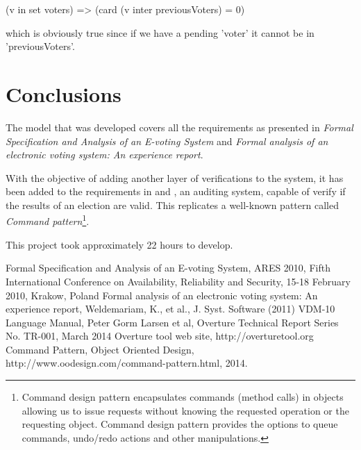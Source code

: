 \documentclass{article}
\begin{document}
\begin{vdmpp}
(v in set voters) => (card ({v} inter previousVoters) = 0) 
\end{vdmpp}

which is obviously true since if we have a pending 'voter' it cannot be in 'previousVoters'.

\section{Conclusions}
The model that was developed covers all the requirements as presented in \textit{Formal Specification and Analysis of an E-voting System}\cite{intro} and \textit{Formal analysis of an electronic voting system: An experience report}\cite{intro2}.

With the objective of adding another layer of verifications to the system, it has been added to the requirements in \cite{intro} and \cite{intro2}, an auditing system, capable of verify if the results of an election are valid. This replicates a well-known pattern called \textit{Command pattern}\footnote{Command design pattern encapsulates commands (method calls) in objects allowing us to issue requests without knowing the requested operation or the requesting object. Command design pattern provides the options to queue commands, undo/redo actions and other manipulations\cite{cmd}.}.

This project took approximately 22 hours to develop.


\renewcommand{\refname}{\section{References}} 
\begin{thebibliography}{99}
Formal Specification and Analysis of an E-voting System, ARES 2010, Fifth International Conference on Availability, Reliability and Security, 15-18 February 2010, Krakow, Poland
Formal analysis of an electronic voting system: An experience report, Weldemariam, K., et al., J. Syst. Software (2011)
VDM-10 Language Manual, Peter Gorm Larsen et al, Overture Technical Report Series No. TR-001, March 2014
Overture tool web site, http://overturetool.org 
Command Pattern, Object Oriented Design, http://www.oodesign.com/command-pattern.html, 2014.

\end{thebibliography}
\end{document}
